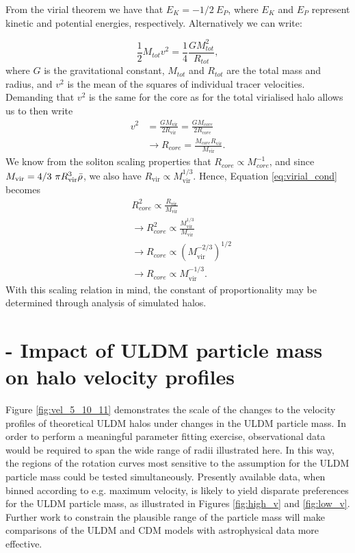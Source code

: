 \documentclass{pasa}%
\begin{document}
\begin{appendix}
From the virial theorem we have that $E_K=-1/2 \ E_P$, where $E_K$ and $E_P$ represent kinetic and potential energies, respectively. Alternatively we can write:

\begin{equation}
    \frac{1}{2}M_{tot}v^2=\frac{1}{4}\frac{GM_{tot}^2}{R_{tot}},
\end{equation}
where $G$ is the gravitational constant, $M_{tot}$ and $R_{tot}$ are the total mass and radius, and $v^2$ is the mean of the squares of individual tracer velocities. Demanding that $v^2$ is the same for the core as for the total virialised halo allows us to then write
\begin{align}\label{eq:virial_cond}
    v^2&=\frac{GM_{\mathrm{vir}}}{2 R_{\mathrm{vir}}}=\frac{G M_{core}}{2 R_{core}}\nonumber\\
    &\rightarrow R_{core}=\frac{M_{core} R_{\mathrm{vir}}}{M_{\mathrm{vir}}}.
\end{align}
We know from the soliton scaling properties that $R_{core}\propto M_{core}^{-1}$, and since $M_{\mathrm{vir}}=4/3 \ \pi R_{\mathrm{vir}}^3 \Bar{\rho}$, we also have $R_{\mathrm{vir}} \propto M_{\mathrm{vir}}^{1/3}$. Hence, Equation \ref{eq:virial_cond} becomes
\begin{align}
    &R_{core}^2\propto \frac{R_{\mathrm{vir}}}{M_{\mathrm{vir}}}\nonumber\\
    &\rightarrow R_{core}^2\propto \frac{M_{\mathrm{vir}}^{1/3}}{M_{\mathrm{vir}}}\nonumber\\
    &\rightarrow R_{core}\propto\left(M_{\mathrm{vir}}^{-2/3}\right)^{1/2}\nonumber\\
    &\rightarrow R_{core}\propto M_{\mathrm{vir}}^{-1/3}.
\end{align}
With this scaling relation in mind, the constant of proportionality may be determined through analysis of simulated halos. 



\section{ - Impact of ULDM particle mass on halo velocity profiles}

Figure \ref{fig:vel_5_10_11} demonstrates the scale of the changes to the velocity profiles of theoretical ULDM halos under changes in the ULDM particle mass. In order to perform a meaningful parameter fitting exercise, observational data would be required to span the wide range of radii illustrated here. In this way, the regions of the rotation curves most sensitive to the assumption for the ULDM particle mass could be tested simultaneously. Presently available data, when binned according to e.g. maximum velocity, is likely to yield disparate preferences for the ULDM particle mass, as illustrated in Figures \ref{fig:high_v} and \ref{fig:low_v}. Further work to constrain the plausible range of the particle mass will make comparisons of the ULDM and CDM models with astrophysical data more effective.

 
\end{appendix}



\end{document}
